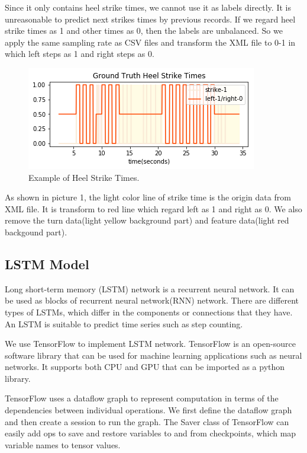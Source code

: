 \documentclass[11pt]{article}
\begin{document}
Since it only contains heel strike times, we cannot use it as labels directly. It is unreasonable to predict next strikes times by previous records. If we regard heel strike times as 1 and other times as 0, then the labels are unbalanced. So we apply the same sampling rate as CSV files and transform the XML file to 0-1 in which left steps as 1 and right steps as 0.

\begin{figure}[ht]
\centering
\includegraphics[scale=0.55]{ground_truth_1.png}
\caption{Example of Heel Strike Times.}
\label{fig:label}
\end{figure}

As shown in picture 1, the light color line of strike time is the origin data from XML file. It is transform to red line which regard left as 1 and right as 0. We also remove the turn data(light yellow background part) and feature data(light red backgound part).




\subsection{LSTM Model}
Long short-term memory (LSTM) network is a recurrent neural network. It can be used as blocks of recurrent neural network(RNN) network. There are different types of LSTMs, which differ in the components or connections that they have. An LSTM is suitable to predict time series such as step counting.

We use TensorFlow to implement LSTM network. TensorFlow is an open-source software library that can be used for machine learning applications such as neural networks. It supports both CPU and GPU that can be imported as a python library.

TensorFlow uses a dataflow graph to represent computation in terms of the dependencies between individual operations. We first define the dataflow graph and then create a session to run the graph. The Saver class of TensorFlow can easily add ops to save and restore variables to and from checkpoints, which map variable names to tensor values.
\end{document}
